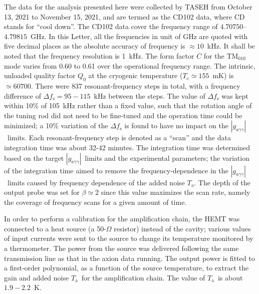 \documentclass[%
 reprint,prl, %
superscriptaddress,
 amsmath,amssymb,
 aps,
]{revtex4-2}
\newcommand{\gagg}{\ensuremath{\left|g_{a\gamma\gamma}\right|}}
\newcommand{\ta}{\ensuremath{T_\text{a}}}
\newcommand{\flo}{\ensuremath{4.70750}}
\newcommand{\fhi}{\ensuremath{4.79815}}
\newcommand{\noise}{\ensuremath{1.9 - 2.2}}
\begin{document}
The data for the analysis presented here were collected by TASEH 
from October 13, 2021 to November 15, 2021, and are termed as the CD102 data, 
where CD stands for ``cool down''. 
The CD102 data cover the frequency range of \flo--\fhi~GHz. In this Letter, 
all the frequencies in unit of GHz are quoted with five decimal places as the 
absolute accuracy of frequency is $\approx 10$~kHz. It shall be noted that the 
frequency resolution is 1~kHz.  
The form factor $C$ for 
the TM$_{010}$ mode varies from 0.60 to 0.61 over the operational 
frequency range. 
The intrinsic, unloaded quality factor $Q_0$ at the cryogenic temperature 
($T_\mathrm{c}\simeq 155$~mK) is $\simeq 60700$. 
There were 837 resonant-frequency steps in total, with a frequency difference 
of $\Delta f_\text{s}=95-115$~kHz between the steps. The value of 
$\Delta f_\text{s}$ was kept within 10\% of 105~kHz rather than 
a fixed value, such that the rotation angle of the tuning rod did not need to 
be fine-tuned and the operation time could be minimized; a 10\% variation of 
the $\Delta f_\text{s}$ is found to have no impact on the \gagg\ limits. 
Each resonant-frequency step is denoted as a ``scan'' 
and the data integration time was about 32-42 minutes. The integration 
time was determined based on the target \gagg\ limits and the experimental 
parameters; the variation of the integration 
time aimed to remove the frequency-dependence in the \gagg\ limits caused by   
frequency dependence of the added noise \ta. 
The depth of the output probe was set for 
$\beta\simeq2$ since this value maximizes the scan rate, namely the coverage 
of frequency scans for a given amount of time. 

In order to perform a calibration for the amplification chain, 
the HEMT was connected to a heat source (a 50-$\Omega$ resistor) instead of
the cavity;
various values of input currents were sent to the source to change its
temperature monitored by a thermometer. The power from the source
was delivered following the same transmission line as that in the axion
data running. 
The output power is fitted to a first-order polynomial, as a function of
the source temperature, to extract the gain and added noise \ta\ for the
amplification chain. The value of \ta\ is about \noise~K. 
%



\end{document}
